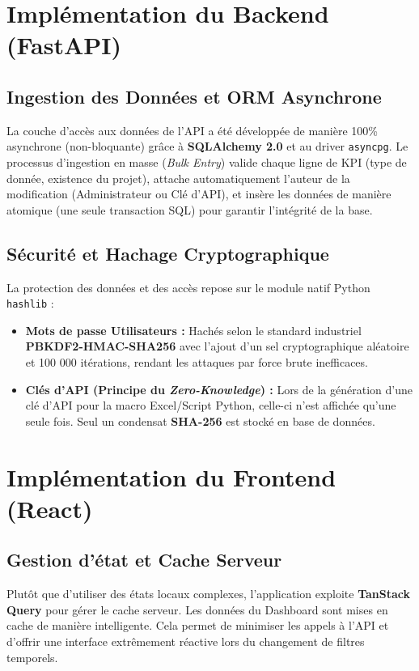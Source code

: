 \section{Implémentation du Backend (FastAPI)}

\subsection{Ingestion des Données et ORM Asynchrone}
La couche d'accès aux données de l'API a été développée de manière 100\% asynchrone (non-bloquante) grâce à \textbf{SQLAlchemy 2.0} et au driver \texttt{asyncpg}. 
Le processus d'ingestion en masse (\textit{Bulk Entry}) valide chaque ligne de KPI (type de donnée, existence du projet), attache automatiquement l'auteur de la modification (Administrateur ou Clé d'API), et insère les données de manière atomique (une seule transaction SQL) pour garantir l'intégrité de la base.

\subsection{Sécurité et Hachage Cryptographique}
La protection des données et des accès repose sur le module natif Python \texttt{hashlib} :
\begin{itemize}
    \item \textbf{Mots de passe Utilisateurs :} Hachés selon le standard industriel \textbf{PBKDF2-HMAC-SHA256} avec l'ajout d'un sel cryptographique aléatoire et 100 000 itérations, rendant les attaques par force brute inefficaces.
    \item \textbf{Clés d'API (Principe du \textit{Zero-Knowledge}) :} Lors de la génération d'une clé d'API pour la macro Excel/Script Python, celle-ci n'est affichée qu'une seule fois. Seul un condensat \textbf{SHA-256} est stocké en base de données.
\end{itemize}

\section{Implémentation du Frontend (React)}

\subsection{Gestion d'état et Cache Serveur}
Plutôt que d'utiliser des états locaux complexes, l'application exploite \textbf{TanStack Query} pour gérer le cache serveur. Les données du Dashboard sont mises en cache de manière intelligente. Cela permet de minimiser les appels à l'API et d'offrir une interface extrêmement réactive lors du changement de filtres temporels.


